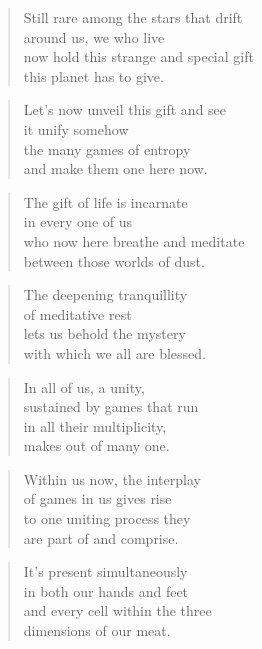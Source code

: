 \documentclass[10pt,a4paper]{article}
\begin{document}
\begin{multicols}{2}


\begin{verse}
Still rare among the stars that drift\\
around us, we who live\\
now hold this strange and special gift\\
this planet has to give.
\end{verse}

\begin{verse}
Let’s now unveil this gift and see\\
it unify somehow\\
the many games of entropy\\
and make them one here now.
\end{verse}

\begin{verse}
The gift of life is incarnate\\
in every one of us\\
who now here breathe and meditate\\
between those worlds of dust.
\end{verse}

\begin{verse}
The deepening tranquillity\\
of meditative rest\\
lets us behold the mystery\\
with which we all are blessed.
\end{verse}

\begin{verse}
In all of us, a unity,\\
sustained by games that run\\
in all their multiplicity,\\
makes out of many one.
\end{verse}

\begin{verse}
Within us now, the interplay\\
of games in us gives rise\\
to one uniting process they\\
are part of and comprise.
\end{verse}

\begin{verse}
It’s present simultaneously\\
in both our hands and feet\\
and every cell within the three\\
dimensions of our meat.
\end{verse}


\end{multicols}
\end{document}
